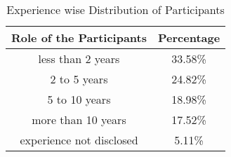 \begin{table}[h]
\centering
\caption{Experience wise Distribution of Participants}
\begin{tabular}{|c|c|}
\hline
\textbf{Role of the Participants} & \textbf{Percentage}\\
\hline
less than 2 years & 33.58\%\\ 
2 to 5 years & 24.82\%\\ 
5 to 10 years & 18.98\%\\
more than 10 years & 17.52\%\\
experience not disclosed & 5.11\%\\
\hline
\end{tabular}
\label{tab:experience}
\end{table}